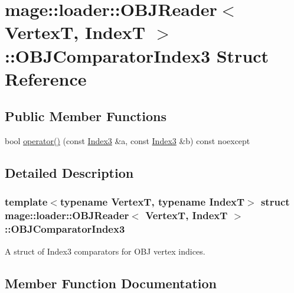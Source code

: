 \hypertarget{structmage_1_1loader_1_1_o_b_j_reader_1_1_o_b_j_comparator_index3}{}\section{mage\+:\+:loader\+:\+:O\+B\+J\+Reader$<$ VertexT, IndexT $>$\+:\+:O\+B\+J\+Comparator\+Index3 Struct Reference}
\label{structmage_1_1loader_1_1_o_b_j_reader_1_1_o_b_j_comparator_index3}
\subsection*{Public Member Functions}
\begin{DoxyCompactItemize}
\item 
bool \hyperlink{structmage_1_1loader_1_1_o_b_j_reader_1_1_o_b_j_comparator_index3_ab3d41e2fb4ddbb86dce2c830cc0ad726}{operator()} (const \hyperlink{classmage_1_1loader_1_1_o_b_j_reader_af9aab131e88c5a3a0f29b156c4c97096}{Index3} \&a, const \hyperlink{classmage_1_1loader_1_1_o_b_j_reader_af9aab131e88c5a3a0f29b156c4c97096}{Index3} \&b) const noexcept
\end{DoxyCompactItemize}


\subsection{Detailed Description}
\subsubsection*{template$<$typename VertexT, typename IndexT$>$\newline
struct mage\+::loader\+::\+O\+B\+J\+Reader$<$ Vertex\+T, Index\+T $>$\+::\+O\+B\+J\+Comparator\+Index3}

A struct of {\ttfamily Index3} comparators for O\+BJ vertex indices. 

\subsection{Member Function Documentation}
\hypertarget{structmage_1_1loader_1_1_o_b_j_reader_1_1_o_b_j_comparator_index3_ab3d41e2fb4ddbb86dce2c830cc0ad726}{}\label{structmage_1_1loader_1_1_o_b_j_reader_1_1_o_b_j_comparator_index3_ab3d41e2fb4ddbb86dce2c830cc0ad726} 
